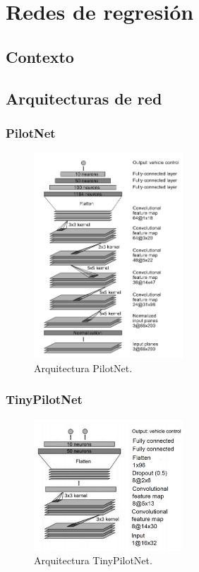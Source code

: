 \chapter{Redes de regresión}\label{cap.regresion}

\section{Contexto}

\section{Arquitecturas de red}

\subsection{PilotNet}

\begin{figure}
\begin{center}
	\includegraphics[width=0.5\textwidth]{figures/Regresion/pilotnet.png}
   \caption{Arquitectura PilotNet.}
	\label{fig.Pilotnet}
\end{center}
\end{figure}


\subsection{TinyPilotNet}

\begin{figure}
\begin{center}
	\includegraphics[width=0.5\textwidth]{figures/Regresion/tinypilotnet.png}
   \caption{Arquitectura TinyPilotNet.}
	\label{fig.TinyPilotNet}
\end{center}
\end{figure}

